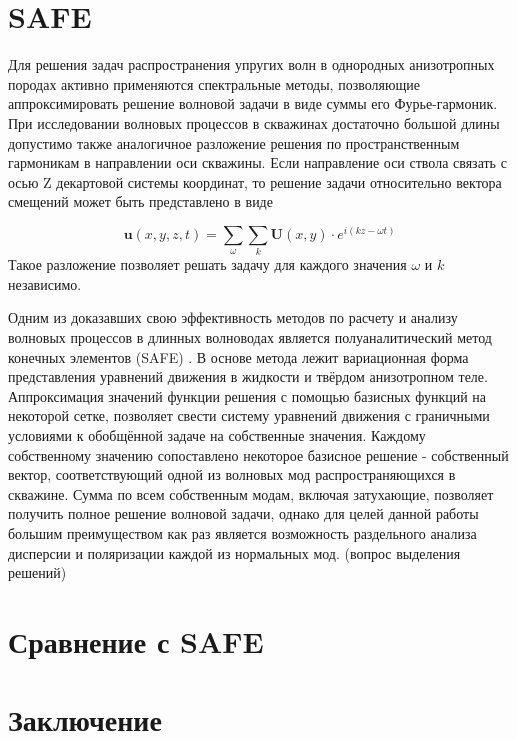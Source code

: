 \documentclass[a4paper,11pt]{article}
\begin{document}
\section{SAFE}

Для решения задач распространения упругих волн в однородных анизотропных породах активно применяются спектральные методы, позволяющие аппроксимировать решение волновой задачи в виде суммы его Фурье-гармоник. При исследовании волновых процессов в скважинах достаточно большой длины допустимо также аналогичное разложение решения по пространственным гармоникам в направлении оси скважины. Если направление оси ствола связать с осью Z декартовой системы координат, то решение задачи относительно вектора смещений может быть представлено в виде

$$
	\mathbf{u}(x,y,z,t) = \sum_{\omega} \sum_{k} \mathbf{U}(x,y)\cdot e^{i(kz - \omega t)}
$$
Такое разложение позволяет решать задачу для каждого значения $\omega$ и $k$ независимо. 

Одним из доказавших свою эффективность методов по расчету и анализу волновых процессов в длинных волноводах является полуаналитический метод конечных элементов (SAFE) \cite{Bartoli2006}. В основе метода лежит вариационная форма представления уравнений движения в жидкости и твёрдом анизотропном теле. Аппроксимация значений функции решения с помощью базисных функций на некоторой сетке, позволяет свести систему уравнений движения с граничными условиями к обобщённой задаче на собственные значения. Каждому собственному значению сопоставлено некоторое базисное решение - собственный вектор, соответствующий одной из волновых мод распространяющихся в скважине. Сумма по всем собственным модам, включая затухающие, позволяет получить полное решение волновой задачи, однако для целей данной работы большим преимуществом как раз является возможность раздельного анализа дисперсии и поляризации каждой из нормальных мод. (вопрос выделения решений)

\section{Сравнение с SAFE}



\section{Заключение}

%
%
\end{document}
